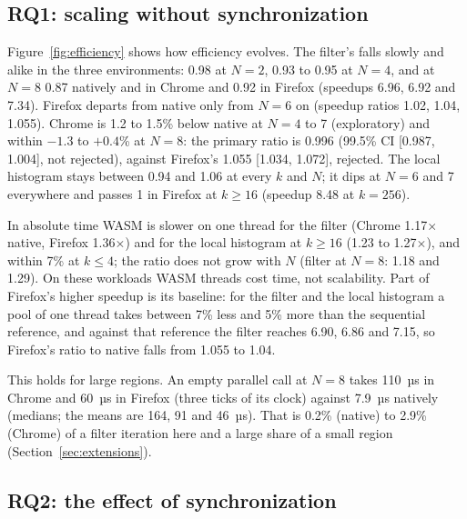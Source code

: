 \documentclass[sigplan]{acmart}
\begin{document}
\subsection{RQ1: scaling without synchronization}

Figure~\ref{fig:efficiency} shows how efficiency evolves. The filter's
falls slowly and alike in the three environments: 0.98 at $N=2$, 0.93 to
0.95 at $N=4$, and at $N=8$ 0.87 natively and in Chrome and 0.92 in Firefox
(speedups 6.96, 6.92 and 7.34). Firefox departs from native only from $N=6$
on (speedup ratios 1.02, 1.04, 1.055). Chrome is 1.2 to 1.5\% below native
at $N=4$ to 7 (exploratory) and within $-1.3$ to $+0.4$\% at $N=8$: the
primary ratio is 0.996 (99.5\% CI [0.987, 1.004], not rejected), against
Firefox's 1.055 [1.034, 1.072], rejected. The local histogram stays between
0.94 and 1.06 at every $k$ and $N$; it dips at $N=6$ and 7 everywhere and
passes 1 in Firefox at $k \ge 16$ (speedup 8.48 at $k=256$).

In absolute time WASM is slower on one thread for the filter (Chrome
1.17$\times$ native, Firefox 1.36$\times$) and for the local histogram at
$k \ge 16$ (1.23 to 1.27$\times$), and within 7\% at $k \le 4$; the ratio
does not grow with $N$ (filter at $N=8$: 1.18 and 1.29). On these workloads
WASM threads cost time, not scalability. Part of Firefox's higher speedup
is its baseline: for the filter and the local histogram a pool of one
thread takes between 7\% less and 5\% more than the sequential reference,
and against that reference the filter reaches 6.90, 6.86 and 7.15, so
Firefox's ratio to native falls from 1.055 to 1.04.

This holds for large regions. An empty parallel call at $N=8$ takes 110~µs
in Chrome and 60~µs in Firefox (three ticks of its clock) against 7.9~µs
natively (medians; the means are 164, 91 and 46~µs). That is 0.2\%
(native) to 2.9\% (Chrome) of a filter iteration here and a large share of
a small region (Section~\ref{sec:extensions}).

\subsection{RQ2: the effect of synchronization}
\end{document}
